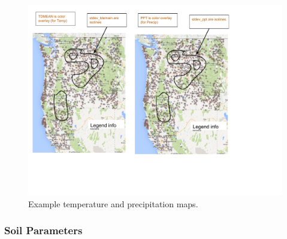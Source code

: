 \documentclass[preprint,12pt]{elsarticle}
\begin{document}
\begin{figure}[hp]
  \centering
  \includegraphics[width=1.0\linewidth]{hart14poplar-model-weather}  
  \caption{Example temperature and precipitation maps.}
  \label{fig:temp}
\end{figure}

\subsubsection{Soil Parameters}
\label{sec:soil}
\end{document}
